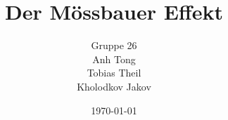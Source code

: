 \documentclass[11pt,a4paper]{scrartcl}
\title{Der Mössbauer Effekt}
\author{Gruppe 26\\ Anh Tong \\ Tobias Theil \\ Kholodkov Jakov }
\date{\today}
\begin{document}
	
\maketitle
\tableofcontents



\newpage







\begin{appendix}

\end{appendix}
 
\end{document}
